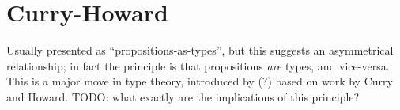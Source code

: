 \section{Curry-Howard}
\label{sect:curry-howard}

\begin{ednote}
  Usually presented as ``propositions-as-types'', but this suggests an
  asymmetrical relationship; in fact the principle is that
  propositions \emph{are} types, and vice-versa.  This is a major move
  in type theory, introduced by \ML(?) based on work by Curry and
  Howard.  TODO: what exactly are the implications of this principle?
\end{ednote}

